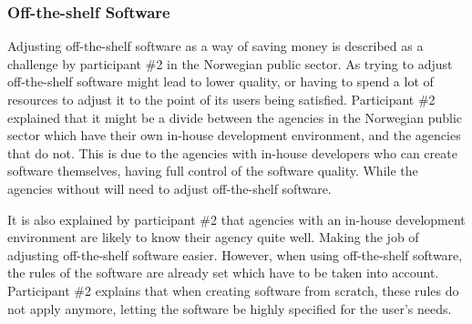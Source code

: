 \subsubsection{Off-the-shelf Software} \label{sec:off_the_shelf_software}
Adjusting off-the-shelf software as a way of saving money is described as a challenge by participant \#2 in the Norwegian public sector. As trying to adjust off-the-shelf software might lead to lower quality, or having to spend a lot of resources to adjust it to the point of its users being satisfied. Participant \#2 explained that it might be a divide between the agencies in the Norwegian public sector which have their own in-house development environment, and the agencies that do not. This is due to the agencies with in-house developers who can create software themselves, having full control of the software quality. While the agencies without will need to adjust off-the-shelf software.


It is also explained by participant \#2 that agencies with an in-house development environment are likely to know their agency quite well. Making the job of adjusting off-the-shelf software easier. However, when using off-the-shelf software, the rules of the software are already set which have to be taken into account. Participant \#2 explains that when creating software from scratch, these rules do not apply anymore, letting the software be highly specified for the user's needs.


